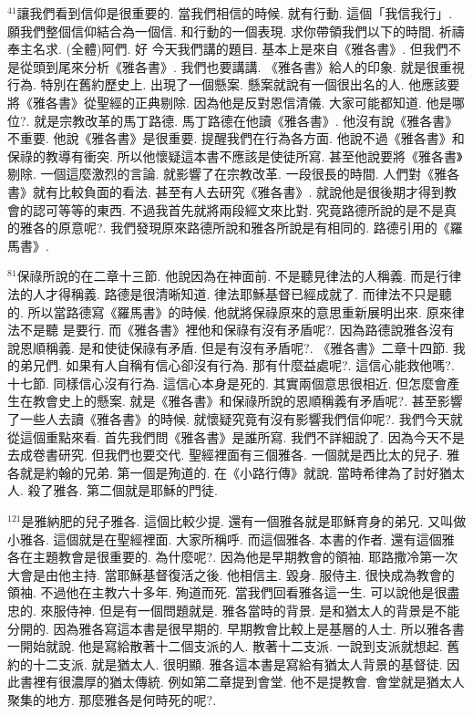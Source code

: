 \documentclass{book}
\begin{document}
$^{41}$讓我們看到信仰是很重要的.
當我們相信的時候.
就有行動.
這個「我信我行」.
願我們整個信仰結合為一個信.
和行動的一個表現.
求你帶領我們以下的時間.
祈禱奉主名求.
(全體)阿們.
好 今天我們講的題目.
基本上是來自《雅各書》.
但我們不是從頭到尾來分析《雅各書》.
我們也要講講.
《雅各書》給人的印象.
就是很重視行為.
特別在舊約歷史上.
出現了一個懸案.
懸案就說有一個很出名的人.
他應該要將《雅各書》從聖經的正典剔除.
因為他是反對恩信清儀.
大家可能都知道.
他是哪位?.
就是宗教改革的馬丁路德.
馬丁路德在他讀《雅各書》.
他沒有說《雅各書》不重要.
他說《雅各書》是很重要.
提醒我們在行為各方面.
他說不過《雅各書》和保祿的教導有衝突.
所以他懷疑這本書不應該是使徒所寫.
甚至他說要將《雅各書》剔除.
一個這麼激烈的言論.
就影響了在宗教改革.
一段很長的時間.
人們對《雅各書》就有比較負面的看法.
甚至有人去研究《雅各書》.
就說他是很後期才得到教會的認可等等的東西.
不過我首先就將兩段經文來比對.
究竟路德所說的是不是真的雅各的原意呢?.
我們發現原來路德所說和雅各所說是有相同的.
路德引用的《羅馬書》.

$^{81}$保祿所說的在二章十三節.
他說因為在神面前.
不是聽見律法的人稱義.
而是行律法的人才得稱義.
路德是很清晰知道.
律法耶穌基督已經成就了.
而律法不只是聽的.
所以當路德寫《羅馬書》的時候.
他就將保祿原來的意思重新展明出來.
原來律法不是聽 是要行.
而《雅各書》裡他和保祿有沒有矛盾呢?.
因為路德說雅各沒有說恩順稱義.
是和使徒保祿有矛盾.
但是有沒有矛盾呢?.
《雅各書》二章十四節.
我的弟兄們.
如果有人自稱有信心卻沒有行為.
那有什麼益處呢?.
這信心能救他嗎?.
十七節.
同樣信心沒有行為.
這信心本身是死的.
其實兩個意思很相近.
但怎麼會產生在教會史上的懸案.
就是《雅各書》和保祿所說的恩順稱義有矛盾呢?.
甚至影響了一些人去讀《雅各書》的時候.
就懷疑究竟有沒有影響我們信仰呢?.
我們今天就從這個重點來看.
首先我們問《雅各書》是誰所寫.
我們不詳細說了.
因為今天不是去成卷書研究.
但我們也要交代.
聖經裡面有三個雅各.
一個就是西比太的兒子.
雅各就是約翰的兄弟.
第一個是殉道的.
在《小路行傳》就說.
當時希律為了討好猶太人.
殺了雅各.
第二個就是耶穌的門徒.

$^{121}$是雅納肥的兒子雅各.
這個比較少提.
還有一個雅各就是耶穌育身的弟兄.
又叫做小雅各.
這個就是在聖經裡面.
大家所稱呼.
而這個雅各.
本書的作者.
還有這個雅各在主題教會是很重要的.
為什麼呢?.
因為他是早期教會的領袖.
耶路撒冷第一次大會是由他主持.
當耶穌基督復活之後.
他相信主.
毀身.
服侍主.
很快成為教會的領袖.
不過他在主教六十多年.
殉道而死.
當我們回看雅各這一生.
可以說他是很盡忠的.
來服侍神.
但是有一個問題就是.
雅各當時的背景.
是和猶太人的背景是不能分開的.
因為雅各寫這本書是很早期的.
早期教會比較上是基層的人士.
所以雅各書一開始就說.
他是寫給散著十二個支派的人.
散著十二支派.
一說到支派就想起.
舊約的十二支派.
就是猶太人.
很明顯.
雅各這本書是寫給有猶太人背景的基督徒.
因此書裡有很濃厚的猶太傳統.
例如第二章提到會堂.
他不是提教會.
會堂就是猶太人聚集的地方.
那麼雅各是何時死的呢?.
\end{document}
